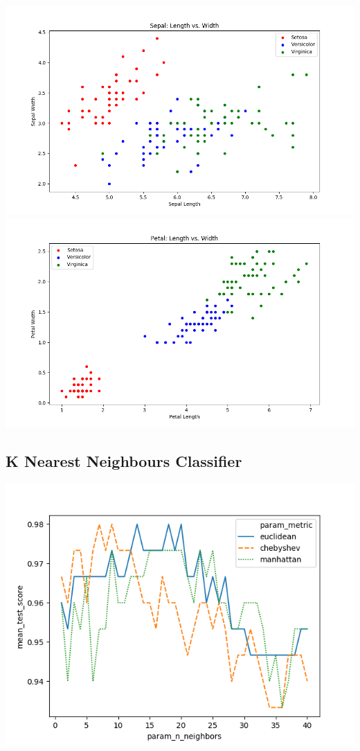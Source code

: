 \documentclass{article}
\begin{document}
\includegraphics[width=\textwidth]{plots/sepal.png}
\includegraphics[width=\textwidth]{plots/petal.png}

\subsection{K Nearest Neighbours Classifier}

\includegraphics[width=\textwidth]{plots/knn_np_comparision.png}
\end{document}
